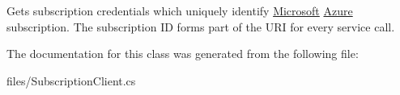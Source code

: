 Gets subscription credentials which uniquely identify \hyperlink{namespace_microsoft}{Microsoft} \hyperlink{namespace_microsoft_1_1_azure}{Azure} subscription. The subscription ID forms part of the U\+RI for every service call. 



The documentation for this class was generated from the following file\+:\begin{DoxyCompactItemize}
\item 
files/Subscription\+Client.\+cs\end{DoxyCompactItemize}
